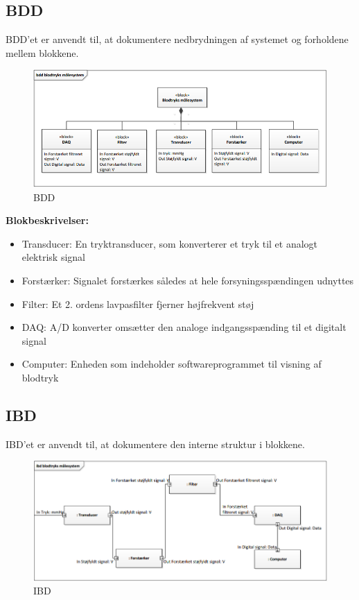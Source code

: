 \subsection{BDD}
BDD'et er anvendt til, at dokumentere nedbrydningen af systemet og forholdene mellem blokkene.  

\begin{figure}[H]
\centering
\includegraphics[scale=0.80]{bdd.PNG}
\caption{BDD}
\end{figure}

\textbf{Blokbeskrivelser:}
\begin{itemize}
\item Transducer: En tryktransducer, som konverterer et tryk til et analogt elektrisk signal
\item Forstærker: Signalet forstærkes således at hele forsyningsspændingen udnyttes
\item Filter: Et 2. ordens lavpasfilter fjerner højfrekvent støj
\item DAQ: A/D konverter omsætter den analoge indgangsspænding til et digitalt signal
\item Computer: Enheden som indeholder softwareprogrammet til visning af blodtryk
\end{itemize}

\newpage

\subsection{IBD}
IBD'et er anvendt til, at dokumentere den interne struktur i blokkene.
\begin{figure}[H]
\centering
\includegraphics[scale=0.65]{ibd.PNG}
\caption{IBD}
\end{figure}

